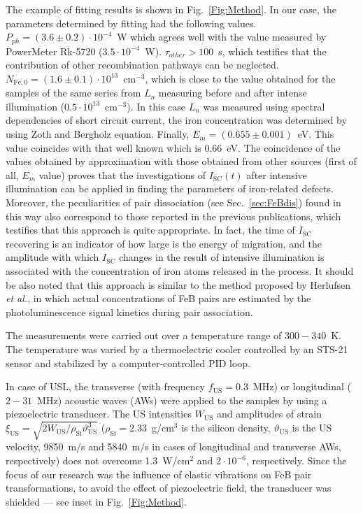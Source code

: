 \documentclass[%
 aip,jap,
 amsmath,amssymb,
 reprint,%
]{revtex4-1}
\begin{document}
The example of fitting results is shown in Fig.~\ref{Fig:Method}.
In our case, the parameters determined by fitting had the following values.
$P_{ph} = (3.6\pm0.2)\cdot10^{-4}$~W which agrees well
with the value measured by PowerMeter Rk-5720 ($3.5\cdot10^{-4}$~W).
$\tau_{other}>100$~s, which testifies that the contribution of other recombination pathways can be neglected.
$N_\mathrm{Fe,0}=(1.6\pm0.1)\cdot10^{13}$~cm$^{-3}$,
which is close to the value obtained for the samples of the same series from $L_n$ measuring before and after intense illumination ($0.5\cdot10^{13}$~cm$^{-3}$).
In this case $L_{n}$ was measured using spectral dependencies of short circuit current\cite{LnIscMethod},
the iron concentration was determined by using Zoth and Bergholz\cite{FeB_Zong} equation.
Finally, $E_m = (0.655\pm0.001)$~eV.
This value coincides with that well known \cite{FeBAssJAP2014,FeBkinAPL2008,FeBKin2019,FeBAssSST2011} which is $0.66$~eV.
The coincidence of the values obtained by approximation
with those obtained from other sources (first of all, $E_m$ value) proves
that the investigations of $I_\mathrm{SC}(t)$ after intensive illumination can be applied in finding the parameters of iron-related defects.
Moreover, the peculiarities of pair dissociation (see Sec.~\ref{sec:FeBdis}) found in this way also correspond to those reported in the previous publications, which testifies that this approach is quite appropriate.
In fact, the time of $I_\mathrm{SC}$ recovering is an indicator of how large is the energy of migration,
and the amplitude with which $I_\mathrm{SC}$ changes in the result of intensive illumination is associated with the concentration of iron atoms released in the process.
It should be also noted that this approach is similar to the method proposed
by Herlufsen \emph{et al.}\cite{FeMethod2012}, in which actual concentrations of FeB pairs are estimated by the photoluminescence signal kinetics during pair association.

The measurements were carried out over a temperature range of $300-340$~K.
The temperature was varied by a thermoelectric cooler controlled by an STS-21 sensor and stabilized by a computer-controlled PID loop.

In case of USL, the transverse (with frequency $f_\mathrm{US}=0.3$~MHz) or
longitudinal ($2-31$~MHz) acoustic waves (AWs) were applied to the samples by using a piezoelectric transducer.
The US intensities $W_\mathrm{US}$ and amplitudes of strain
$\xi_\mathrm{US}=\sqrt{2W_\mathrm{US}/\rho_\mathrm{Si}\vartheta_\mathrm{US}^3}$
($\rho_\mathrm{Si}=2.33$~g/cm$^3$ is the silicon density,
$\vartheta_\mathrm{US}$ is the US velocity, 9850~m/s and 5840~m/s in cases of longitudinal and transverse AWs, respectively)
does not overcome 1.3~W/cm$^2$ and $2\cdot10^{-6}$, respectively.
Since the focus of our research was the influence of elastic vibrations on  FeB pair transformations,   to avoid the effect of piezoelectric field, the transducer was shielded --– see inset in Fig.~\ref{Fig:Method}.
\end{document}
